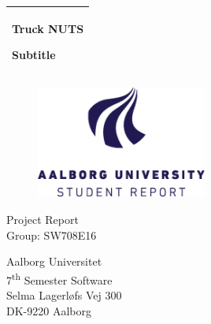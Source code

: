 %
\newcommand{\titlefont}{\sffamily\fontsize{36pt}{0pt}\selectfont}
\newcommand{\subtitlefont}{\sffamily\fontsize{26pt}{0pt}\selectfont}
\newcommand{\otherfont}{\sffamily\fontsize{18pt}{0pt}\selectfont}
\newcommand{\smallfont}{\sffamily\fontsize{12pt}{0pt}\selectfont}
\begin{titlepage}
  \addtolength{\hoffset}{0.5\evensidemargin-0.5\oddsidemargin} %
  \noindent%
  \begin{tabular}{@{}p{\textwidth}@{}}
    \toprule[2pt]
    \midrule
    \vspace{0.2cm}
    \begin{center}
		\titlefont Truck NUTS
    \end{center}
	\vspace{0.1cm}
    \begin{center}
		\subtitlefont Subtitle
	\end{center}
    \vspace{0.2cm}\\
    \midrule
    \toprule[2pt]
  \end{tabular}
  \vspace{2 cm}
  \begin{figure}[h!]
    \centering
    \includegraphics[width=0.5\textwidth]{img/aau-logo-english.png}
  \end{figure}
  \vspace{3 cm}
  \begin{center}
    \otherfont
      Project Report
    \\
    \vspace{0.2cm}
    \otherfont
      Group: SW708E16
  \end{center}
  \vfill
  \begin{center}
  \smallfont
  Aalborg Universitet\\
  7\textsuperscript{th} Semester Software\\ \vspace{0.1cm}
  Selma Lagerløfs Vej 300\\
  DK-9220 Aalborg
  \end{center}
\end{titlepage}
\clearpage
\cleardoublepage
